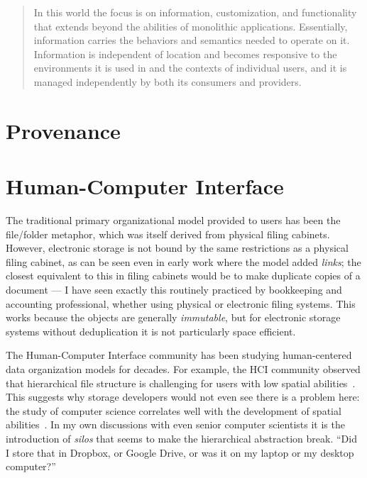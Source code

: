 \begin{quotation}
\begin{itemize}
              In this world the focus is on information, customization, and functionality that
              extends beyond the abilities of monolithic applications. Essentially,
              information carries the behaviors and semantics needed to operate on it.
              Information is independent of location and becomes responsive to the
              environments it is used in and the contexts of individual users, and it is
              managed independently by both its consumers and providers.
    \end{itemize}
\end{quotation}


\section{Provenance}
\label{ch:related-work:sec:provenance}


\section{Human-Computer Interface}
\label{ch:related-work:sec:hci}

The traditional primary organizational model provided to users has been the
file/folder metaphor, which was itself derived from physical filing cabinets.  However,
electronic storage is not bound by the same restrictions as a physical filing
cabinet, as can be seen even in early work  where the
model added \emph{links}; the closest equivalent to this in filing cabinets
would be to make duplicate copies of a document --- I have seen exactly this
routinely practiced by bookkeeping and accounting professional, whether using
physical or electronic filing systems.  This works because the objects are
generally \emph{immutable}, but for electronic storage systems without
deduplication it is not particularly space efficient.

The Human-Computer Interface community has been studying human-centered data
organization models for decades.  For example, the HCI community observed that
hierarchical file structure is challenging for users with low spatial
abilities~\cite{vicente1988accommodating}. This suggests why storage developers
would not even see there is a problem here: the study of computer science
correlates well with the development of spatial
abilities~\cite{parkinson2018spatial}. In my own discussions with even senior
computer scientists it is the introduction of \emph{silos} that seems to make
the hierarchical abstraction break. ``Did I store that in Dropbox, or Google
Drive, or was it on my laptop or my desktop computer?''


